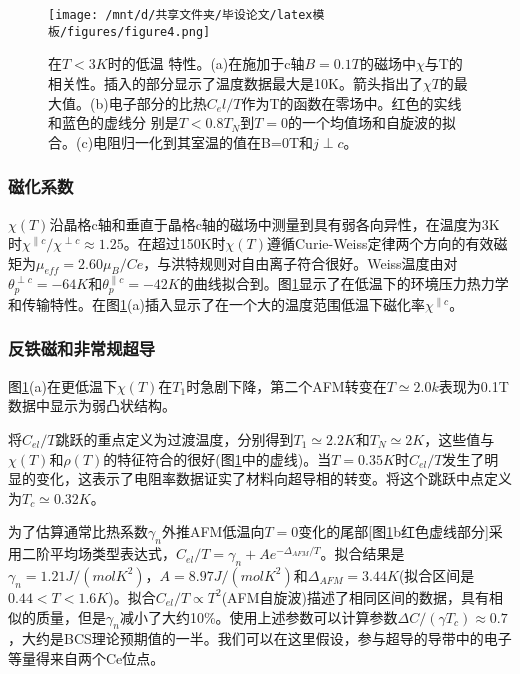 \begin{figure}[h]
    \centering
    \texttt{[image: /mnt/d/共享文件夹/毕设论文/latex模板/figures/figure4.png]}
    \caption{在$T < 3K$时的低温 特性。(a)在施加于c轴$B = 0.1T$的磁场中$\chi$与T的相关性。插入的部分显示了温度数据最大是10K。箭头指出了$\chi T$的最大值。(b)电子部分的比热$C_el/T$作为T的函数在零场中。红色的实线和蓝色的虚线分 别是$T < 0.8T_N$到$T = 0$的一个均值场和自旋波的拟合。(c)电阻归一化到其室温的值在B=0T和$j\perp c$\cite{3}。}
    \label{fig2}
\end{figure}

\subsubsection{磁化系数}
$\chi(T)$沿晶格c轴和垂直于晶格c轴的磁场中测量到具有弱各向异性，在温度为3K时$\chi^{\parallel c}/\chi^{\perp c} \approx 1.25$。在超过150K时$\chi(T)$遵循Curie-Weiss定律两个方向的有效磁矩为$\mu_{eff}=2.60\mu_B /Ce$，与洪特规则对自由离子符合很好。Weiss温度由对$\theta^{\perp c}_{p}=-64K$和$\theta^{\parallel c}_p=-42K$的曲线拟合到。图\ref{fig2}显示了在低温下的环境压力热力学和传输特性。在图\ref{fig2}(a)插入显示了在一个大的温度范围低温下磁化率$\chi^{\parallel c}$。

\subsubsection{反铁磁和非常规超导}
图\ref{fig2}(a)在更低温下$\chi(T)$在$T_1$时急剧下降，第二个AFM转变在$T \simeq 2.0k$表现为0.1T数据中显示为弱凸状结构。

将$C_{el}/T$跳跃的重点定义为过渡温度，分别得到$T_1 \simeq 2.2K$和$T_N \simeq 2K$，这些值与$\chi(T)$和$\rho(T)$的特征符合的很好(图\ref{fig2}中的虚线)。当$T=0.35K$时$C_{el}/T$发生了明显的变化，这表示了电阻率数据证实了材料向超导相的转变。将这个跳跃中点定义为$T_c \simeq 0.32K$。

为了估算通常比热系数$\gamma_n$外推AFM低温向$T=0$变化的尾部[图\ref{fig2}b红色虚线部分]采用二阶平均场类型表达式，$C_{el}/T=\gamma_n + A e^{-\Delta_{AFM}/T}$。拟合结果是$\gamma_n=1.21J/(molK^2)$，$A=8.97J/(molK^2)$和$\Delta_{AFM}=3.44K$(拟合区间是$0.44<T<1.6K$)。拟合$C_{el}/T \propto T^2$(AFM自旋波)描述了相同区间的数据，具有相似的质量，但是$\gamma_n$减小了大约10\%。使用上述参数可以计算参数$\Delta C/(\gamma T_c)\approx 0.7$，大约是BCS理论预期值的一半。我们可以在这里假设，参与超导的导带中的电子等量得来自两个Ce位点。







